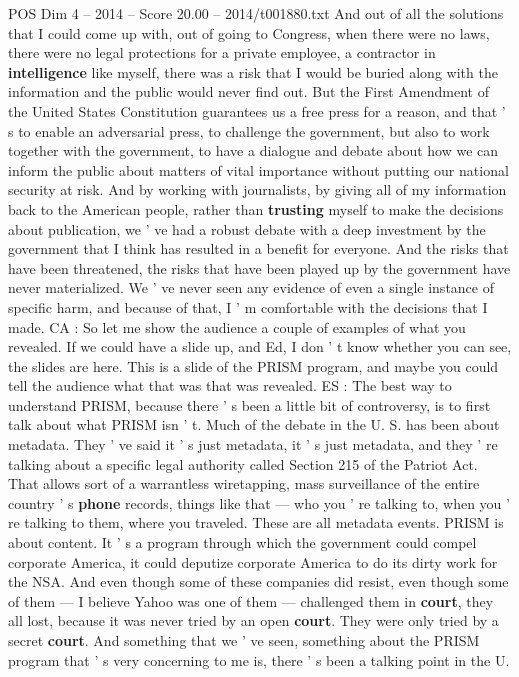 \begin{textsample}{POS Dim 4 – 2014 – Score 20.00 – 2014/t001880.txt}
And out of all the solutions that I could come up with, out of going to Congress, when there were no laws, there were no legal protections for a private employee, a contractor in \textbf{intelligence} like myself, there was a risk that I would be buried along with the information and the public would never find out.
But the First Amendment of the United States Constitution guarantees us a free press for a reason, and that ' s to enable an adversarial press, to challenge the government, but also to work together with the government, to have a dialogue and debate about how we can inform the public about matters of vital importance without putting our national security at risk.
And by working with journalists, by giving all of my information back to the American people, rather than \textbf{trusting} myself to make the decisions about publication, we ' ve had a robust debate with a deep investment by the government that I think has resulted in a benefit for everyone.
And the risks that have been threatened, the risks that have been played up by the government have never materialized.
We ' ve never seen any evidence of even a single instance of specific harm, and because of that, I ' m comfortable with the decisions that I made.
CA : So let me show the audience a couple of examples of what you revealed.
If we could have a slide up, and Ed, I don ' t know whether you can see, the slides are here.
This is a slide of the PRISM program, and maybe you could tell the audience what that was that was revealed.
ES : The best way to understand PRISM, because there ' s been a little bit of controversy, is to first talk about what PRISM isn ' t.
Much of the debate in the U.
S. has been about metadata.
They ' ve said it ' s just metadata, it ' s just metadata, and they ' re talking about a specific legal authority called Section 215 of the Patriot Act.
That allows sort of a warrantless wiretapping, mass surveillance of the entire country ' s \textbf{phone} records, things like that — who you ' re talking to, when you ' re talking to them, where you traveled.
These are all metadata events.
PRISM is about content.
It ' s a program through which the government could compel corporate America, it could deputize corporate America to do its dirty work for the NSA.
And even though some of these companies did resist, even though some of them — I believe Yahoo was one of them — challenged them in \textbf{court}, they all lost, because it was never tried by an open \textbf{court}.
They were only tried by a secret \textbf{court}.
And something that we ' ve seen, something about the PRISM program that ' s very concerning to me is, there ' s been a talking point in the U.

\end{textsample}
